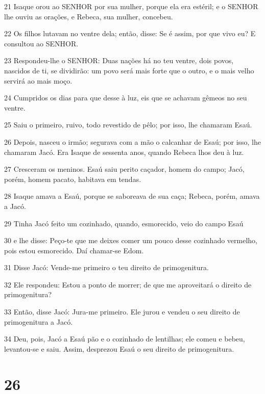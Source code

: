 \par 21 Isaque orou ao SENHOR por sua mulher, porque ela era estéril; e o SENHOR lhe ouviu as orações, e Rebeca, sua mulher, concebeu.
\par 22 Os filhos lutavam no ventre dela; então, disse: Se é assim, por que vivo eu? E consultou ao SENHOR.
\par 23 Respondeu-lhe o SENHOR: Duas nações há no teu ventre, dois povos, nascidos de ti, se dividirão: um povo será mais forte que o outro, e o mais velho servirá ao mais moço.
\par 24 Cumpridos os dias para que desse à luz, eis que se achavam gêmeos no seu ventre.
\par 25 Saiu o primeiro, ruivo, todo revestido de pêlo; por isso, lhe chamaram Esaú.
\par 26 Depois, nasceu o irmão; segurava com a mão o calcanhar de Esaú; por isso, lhe chamaram Jacó. Era Isaque de sessenta anos, quando Rebeca lhos deu à luz.
\par 27 Cresceram os meninos. Esaú saiu perito caçador, homem do campo; Jacó, porém, homem pacato, habitava em tendas.
\par 28 Isaque amava a Esaú, porque se saboreava de sua caça; Rebeca, porém, amava a Jacó.
\par 29 Tinha Jacó feito um cozinhado, quando, esmorecido, veio do campo Esaú
\par 30 e lhe disse: Peço-te que me deixes comer um pouco desse cozinhado vermelho, pois estou esmorecido. Daí chamar-se Edom.
\par 31 Disse Jacó: Vende-me primeiro o teu direito de primogenitura.
\par 32 Ele respondeu: Estou a ponto de morrer; de que me aproveitará o direito de primogenitura?
\par 33 Então, disse Jacó: Jura-me primeiro. Ele jurou e vendeu o seu direito de primogenitura a Jacó.
\par 34 Deu, pois, Jacó a Esaú pão e o cozinhado de lentilhas; ele comeu e bebeu, levantou-se e saiu. Assim, desprezou Esaú o seu direito de primogenitura.

\chapter{26}

